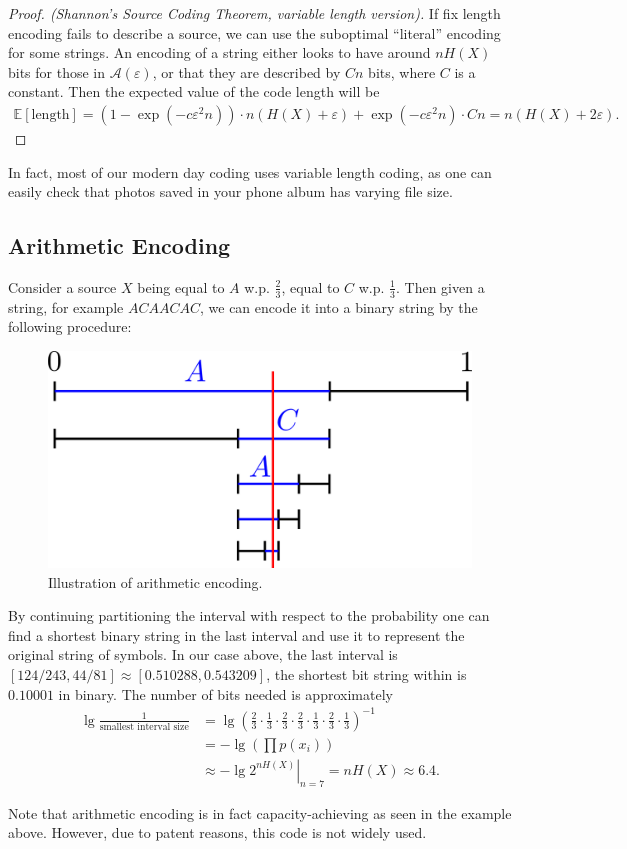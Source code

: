 \begin{proof}[Proof. (Shannon's Source Coding Theorem, variable length version)]
    If fix length encoding fails to describe a source, we can use the suboptimal ``literal'' encoding for some strings. An encoding of a string either looks to have around $n H(X)$ bits for those in $\mathcal{A}(\varepsilon)$, or that they are described by $Cn$ bits, where $C$ is a constant. Then the expected value of the code length will be
    \begin{align*}
        \mathbb{E}[\text{length}] = \left(1-\exp(-c\varepsilon^2n)\right) \cdot n\left(H(X)+\varepsilon\right) + \exp(-c\varepsilon^2n)\cdot Cn = n\left(H(X)+2\varepsilon\right).
    \end{align*}
\end{proof}

In fact, most of our modern day coding uses variable length coding, as one can easily check that photos saved in your phone album has varying file size.

\subsection{Arithmetic Encoding}
\begin{example}
    Consider a source $X$ being equal to $A$ w.p. $\frac{2}{3}$, equal to $C$ w.p. $\frac{1}{3}$. Then given a string, for example $ACAACAC$, we can encode it into a binary string by the following procedure:
    \begin{figure}[H]
        \centering
        \includegraphics[width=0.5\linewidth]{figures/w4_arithmetic_encoding.png}
        \caption{Illustration of arithmetic encoding.}
    \end{figure}
    By continuing partitioning the interval with respect to the probability one can find a shortest binary string in the last interval and use it to represent the original string of symbols. In our case above, the last interval is $[124/243,44/81]\approx[0.510288,0.543209]$, the shortest bit string within is $0.10001$ in binary. The number of bits needed is approximately
    \begin{align*}
        \lg\frac{1}{\text{smallest interval size}} &= \lg\left(\frac{2}{3}\cdot\frac{1}{3}\cdot\frac{2}{3}\cdot\frac{2}{3}\cdot\frac{1}{3}\cdot\frac{2}{3}\cdot\frac{1}{3}\right)^{-1} \\
        &= -\lg\left(\prod p(x_i)\right)\\
        &\approx -\lg\left.2^{nH(X)}\right|_{n=7} = n H(X)\approx 6.4.
    \end{align*}
\end{example}
Note that arithmetic encoding is in fact capacity-achieving as seen in the example above. However, due to patent reasons, this code is not widely used.

